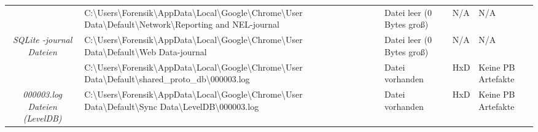 \begin{appendices}
{\begin{landscape}
\begin{table}[h!]
{\begin{tabular}{cllll}
		\multicolumn{1}{|c|}{}                                                        & \multicolumn{1}{l|}{\cellcolor[HTML]{34CDF9}C:\textbackslash{}Users\textbackslash{}Forensik\textbackslash{}AppData\textbackslash{}Local\textbackslash{}Google\textbackslash{}Chrome\textbackslash{}User   Data\textbackslash{}Default\textbackslash{}Network\textbackslash{}Reporting and NEL-journal}                                                                          & \multicolumn{1}{l|}{\cellcolor[HTML]{AB70E9}Datei leer (0 Bytes groß)}                            & \multicolumn{1}{l|}{\cellcolor[HTML]{C0C0C0}N/A}           & \multicolumn{1}{l|}{\cellcolor[HTML]{C0C0C0}N/A}                \\ \cline{2-5} 
		\multicolumn{1}{|c|}{\multirow{-3}{*}{\textit{SQLite -journal Dateien}}}      & \multicolumn{1}{l|}{\cellcolor[HTML]{34CDF9}C:\textbackslash{}Users\textbackslash{}Forensik\textbackslash{}AppData\textbackslash{}Local\textbackslash{}Google\textbackslash{}Chrome\textbackslash{}User   Data\textbackslash{}Default\textbackslash{}Web Data-journal}                                                                                                          & \multicolumn{1}{l|}{\cellcolor[HTML]{AB70E9}Datei leer (0 Bytes groß)}                            & \multicolumn{1}{l|}{\cellcolor[HTML]{C0C0C0}N/A}           & \multicolumn{1}{l|}{\cellcolor[HTML]{C0C0C0}N/A}                \\ \hline
		\multicolumn{1}{|c|}{}                                                        & \multicolumn{1}{l|}{\cellcolor[HTML]{34CDF9}C:\textbackslash{}Users\textbackslash{}Forensik\textbackslash{}AppData\textbackslash{}Local\textbackslash{}Google\textbackslash{}Chrome\textbackslash{}User   Data\textbackslash{}Default\textbackslash{}shared\_proto\_db\textbackslash{}000003.log}                                                                               & \multicolumn{1}{l|}{\cellcolor[HTML]{009901}Datei vorhanden}                                      & \multicolumn{1}{l|}{HxD}                                   & \multicolumn{1}{l|}{\cellcolor[HTML]{F8A102}Keine PB Artefakte} \\ \cline{2-5} 
		\multicolumn{1}{|c|}{\multirow{-2}{*}{\textit{000003.log Dateien (LevelDB)}}} & \multicolumn{1}{l|}{\cellcolor[HTML]{34CDF9}C:\textbackslash{}Users\textbackslash{}Forensik\textbackslash{}AppData\textbackslash{}Local\textbackslash{}Google\textbackslash{}Chrome\textbackslash{}User   Data\textbackslash{}Default\textbackslash{}Sync Data\textbackslash{}LevelDB\textbackslash{}000003.log}                                                                & \multicolumn{1}{l|}{\cellcolor[HTML]{009901}Datei vorhanden}                                      & \multicolumn{1}{l|}{HxD}                                   & \multicolumn{1}{l|}{\cellcolor[HTML]{F8A102}Keine PB Artefakte} \\ \hline

\end{tabular}}
\end{table}
\end{landscape}}
\end{appendices}

